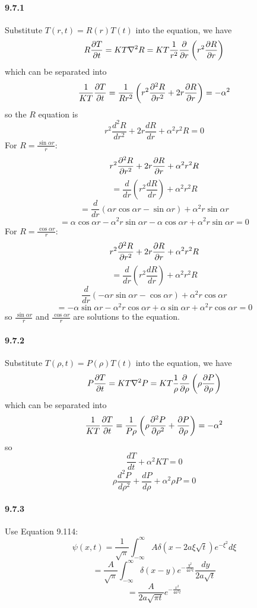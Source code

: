 \documentclass[a4paper]{article}
\begin{document}
\paragraph{9.7.1}
Substitute $T(r,t)=R(r)T(t)$ into the equation, we have
\[
R\frac{\partial T}{\partial t}=KT\nabla^2R=KT\frac{1}{r^2}\frac{\partial}{\partial r}\left(r^2\frac{\partial R}{\partial r} \right)
\]
which can be separated into
\[
\frac{1}{KT}\frac{\partial T}{\partial t}=\frac{1}{Rr^2}\left(r^2\frac{\partial^2R}{\partial r^2}+2r\frac{\partial R}{\partial r} \right)=-\alpha^2
\]
so the $R$ equation is
\[
r^2\frac{d^2R}{dr^2}+2r\frac{dR}{dr}+\alpha^2r^2R=0
\]
For $R=\frac{\sin\alpha r}{r}$:
\[
r^2\frac{\partial^2R}{\partial r^2}+2r\frac{\partial R}{\partial r}+\alpha^2r^2R
\]
\[
=\frac{d}{dr}\left(r^2\frac{dR}{dr}\right)+\alpha^2r^2R
\]
\[
=\frac{d}{dr}\left(\alpha r\cos\alpha r-\sin\alpha r\right)+\alpha^2r\sin\alpha r
\]
\[
=\alpha\cos\alpha r-\alpha^2r\sin\alpha r-\alpha\cos\alpha r+\alpha^2 r\sin\alpha r=0
\]
For $R=\frac{\cos\alpha r}{r}$:
\[
r^2\frac{\partial^2R}{\partial r^2}+2r\frac{\partial R}{\partial r}+\alpha^2r^2R
\]
\[
=\frac{d}{dr}\left(r^2\frac{dR}{dr}\right)+\alpha^2r^2R
\]
\[
\frac{d}{dr}\left(-\alpha r\sin\alpha r-\cos\alpha r\right)+\alpha^2r\cos\alpha r
\]
\[
=-\alpha\sin\alpha r-\alpha^2r\cos\alpha r+\alpha\sin\alpha r+\alpha^2r\cos\alpha r=0
\]
so $\frac{\sin\alpha r}{r}$ and $\frac{\cos\alpha r}{r}$ are solutions to the equation.

\paragraph{9.7.2}
Substitute $T(\rho,t)=P(\rho)T(t)$ into the equation, we have
\[
P\frac{\partial T}{\partial t}=KT\nabla^2P=KT\frac{1}{\rho}\frac{\partial}{\partial\rho}\left(\rho\frac{\partial P}{\partial\rho}\right)
\]
which can be separated into
\[
\frac{1}{KT}\frac{\partial T}{\partial t}=\frac{1}{P\rho}\left(\rho\frac{\partial^2P}{\partial\rho^2}+\frac{\partial P}{\partial\rho}\right)=-\alpha^2
\]
so
\[
\frac{dT}{dt}+\alpha^2KT=0
\]
\[
\rho\frac{d^2P}{d\rho^2}+\frac{dP}{d\rho}+\alpha^2\rho P=0
\]

\paragraph{9.7.3}
Use Equation 9.114:
\[
\psi(x,t)=\frac{1}{\sqrt{\pi}}\int_{-\infty}^\infty A\delta(x-2a\xi\sqrt{t})e^{-\xi^2}d\xi
\]
\[
=\frac{A}{\sqrt{\pi}}\int_{-\infty}^{\infty}\delta(x-y)e^{-\frac{y^2}{4a^2t}}\frac{dy}{2a\sqrt{t}}
\]
\[
=\frac{A}{2a\sqrt{\pi t}}e^{-\frac{x^2}{4a^2t}}
\]
\end{document}
